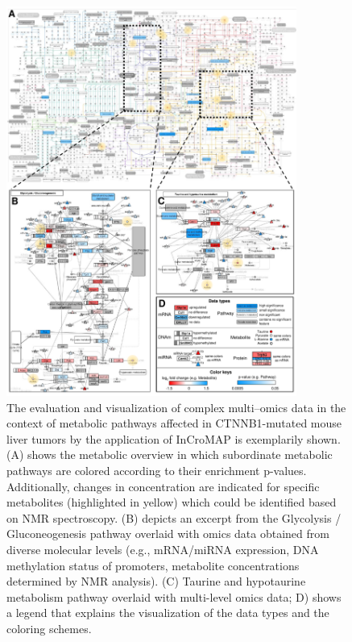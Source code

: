 \documentclass[final,5p,times,twocolumn]{elsarticle}
\newcommand\red[1]{{\color{red}#1}}
\begin{document}
\begin{figure}
\center
\includegraphics[width=0.85\textwidth]{InCroMAP_examples.pdf}
\caption{\red{The evaluation and visualization of complex multi–omics data in the context of metabolic pathways affected in CTNNB1-mutated mouse liver tumors by the application of InCroMAP is exemplarily shown. (A) shows the metabolic overview in which subordinate metabolic pathways are colored according to their enrichment p-values. Additionally, changes
in concentration are indicated for specific metabolites (highlighted in yellow) which could be identified based on NMR spectroscopy. (B) depicts an excerpt from the Glycolysis / Gluconeogenesis pathway overlaid with omics data obtained from diverse molecular levels (e.g., mRNA/miRNA expression, DNA methylation status of promoters, metabolite concentrations determined by NMR analysis). (C) Taurine and hypotaurine metabolism pathway overlaid with multi-level omics data; D) shows a legend that explains the visualization of the data types and the coloring schemes.}}
\label{fig:incromap-examples}
\end{figure}
\end{document}
